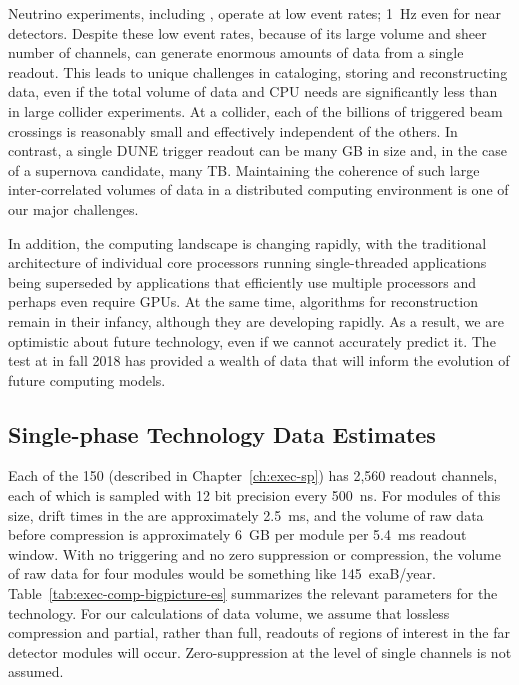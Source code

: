 Neutrino experiments, including , operate at low event rates; \SI{1}{Hz} even for near detectors. 
Despite these low event rates, because of its large volume and sheer number of channels,  can generate enormous amounts of data from a single readout.
This leads to unique challenges in cataloging, storing and reconstructing data, even if the total volume of data and CPU needs are significantly less than in large collider experiments.  At a collider, each of the billions of triggered beam crossings is reasonably small and  effectively independent of the others. In contrast, a single DUNE trigger readout can be many GB in size and, in the case of a supernova candidate, many TB. Maintaining the coherence of such large inter-correlated volumes of data in a distributed computing environment is one of our major challenges. 

In addition, the computing landscape is changing rapidly, with the traditional  architecture of individual core processors running single-threaded applications being superseded by applications that efficiently use multiple processors and perhaps even require GPUs. At the same time,  algorithms for  reconstruction remain in their infancy, although they are developing rapidly.  As a result, we are optimistic about future technology, even if we cannot accurately predict it.  The  test at  in fall 2018 has provided a wealth of data that will inform the evolution of future  computing models.



\subsection{Single-phase Technology Data Estimates}
\label{ch:exec-comp-dtv-sptde}

 
Each of the 150   (described in Chapter~\ref{ch:exec-sp}) has 2,560 readout channels, each of which %
is sampled with 12 bit precision every \SI{500}{ns}. 
For modules of this size, drift times in the  are approximately \SI{2.5}{ms}, and the volume of raw data before compression is approximately \SI{6}{GB} per module per \SI{5.4}{ms} readout window.  With no triggering and no zero suppression or compression, the volume of raw data  for four modules would be something like \SI{145}{exaB/year}. Table~\ref{tab:exec-comp-bigpicture-es} summarizes the relevant parameters for the  technology.  For our calculations of data volume, we assume that lossless compression and partial, rather than full, readouts of regions of interest in the far detector modules will occur.  Zero-suppression at the level of single channels is not assumed. 

